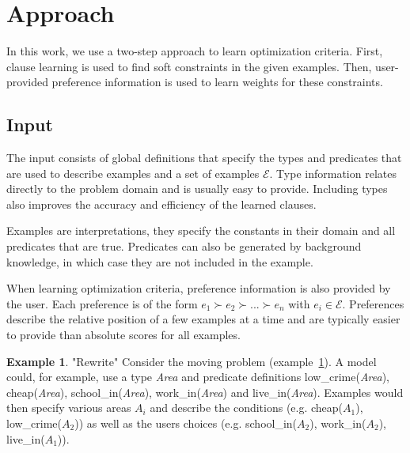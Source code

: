 \documentclass[letterpaper]{article}
\newcommand{\sym}[1]{\ensuremath{\mathcal{#1}}}
\theoremstyle{definition}
\newtheorem{example}{Example}
\begin{document}

\section{Approach}
In this work, we use a two-step approach to learn optimization criteria.
First, clause learning is used to find soft constraints in the given examples.
Then, user-provided preference information is used to learn weights for these constraints.


\subsection{Input}
The input consists of global definitions that specify the types and predicates that are used to describe examples and a set of examples \sym{E}.
Type information relates directly to the problem domain and is usually easy to provide.
Including types also improves the accuracy and efficiency of the learned clauses.

Examples are interpretations, they specify the constants in their domain and all predicates that are true.
Predicates can also be generated by background knowledge, in which case they are not included in the example.

When learning optimization criteria, preference information is also provided by the user.
Each preference is of the form $e_1 \succ e_2 \succ ... \succ e_n$ with $e_i \in \sym{E}$.
Preferences describe the relative position of a few examples at a time and are typically easier to provide than absolute scores for all examples.

\begin{example} "Rewrite"
  \label{ex:moving-input}
  Consider the moving problem (example~\ref{ex:moving-input}).
  A model could, for example, use a type \textit{Area} and predicate definitions low\_crime(\textit{Area}), cheap(\textit{Area}), school\_in(\textit{Area}), work\_in(\textit{Area}) and live\_in(\textit{Area}).
  Examples would then specify various areas $A_i$ and describe the conditions (e.g. cheap($A_1$), low\_crime($A_2$)) as well as the users choices (e.g. school\_in($A_2$), work\_in($A_2$), live\_in($A_1$)).
\end{example}
\end{document}

